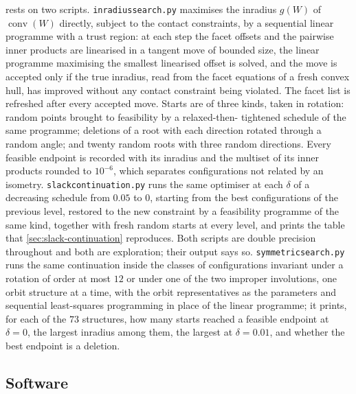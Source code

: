 \documentclass[11pt,reqno]{amsart}
\renewcommand{\_}{\origunderscore\allowbreak}
\numberwithin{equation}{section}
\theoremstyle{plain}
\theoremstyle{definition}
\theoremstyle{remark}
\DeclareMathOperator{\conv}{conv}
\begin{document}
 rests on two scripts.
\texttt{inradius\_search.py} maximises the inradius $g(W)$ of
$\conv(W)$ directly, subject to the contact constraints, by a
sequential linear programme with a trust region: at each step the facet
offsets and the pairwise inner products are linearised in a tangent
move of bounded size, the linear programme maximising the smallest
linearised offset is solved, and the move is accepted only if the true
inradius, read from the facet equations of a fresh convex hull, has
improved without any contact constraint being violated. The facet list
is refreshed after every accepted move. Starts are of three kinds, taken
in rotation: random points brought to feasibility by a relaxed-then-
tightened schedule of the same programme; deletions of a root with each
direction rotated through a random angle; and twenty random roots with
three random directions. Every feasible endpoint is recorded with its
inradius and the multiset of its inner products rounded to $10^{-6}$,
which separates configurations not related by an isometry.
\texttt{slack\_continuation.py} runs the same optimiser at each
$\delta$ of a decreasing schedule from $0.05$ to $0$, starting from the
best configurations of the previous level, restored to the new
constraint by a feasibility programme of the same kind, together with
fresh random starts at every level, and prints the table that
\cref{sec:slack-continuation} reproduces. Both scripts are double
precision throughout and both are exploration; their output says so.
\texttt{symmetric\_search.py} runs the same continuation inside the
classes of configurations invariant under a rotation of order at most
$12$ or under one of the two improper involutions, one orbit structure
at a time, with the orbit representatives as the parameters and
sequential least-squares programming in place of the linear programme;
it prints, for each of the $73$ structures, how many starts reached a
feasible endpoint at $\delta=0$, the largest inradius among them, the
largest at $\delta=0.01$, and whether the best endpoint is a deletion.

\subsection*{Software}
\end{document}

